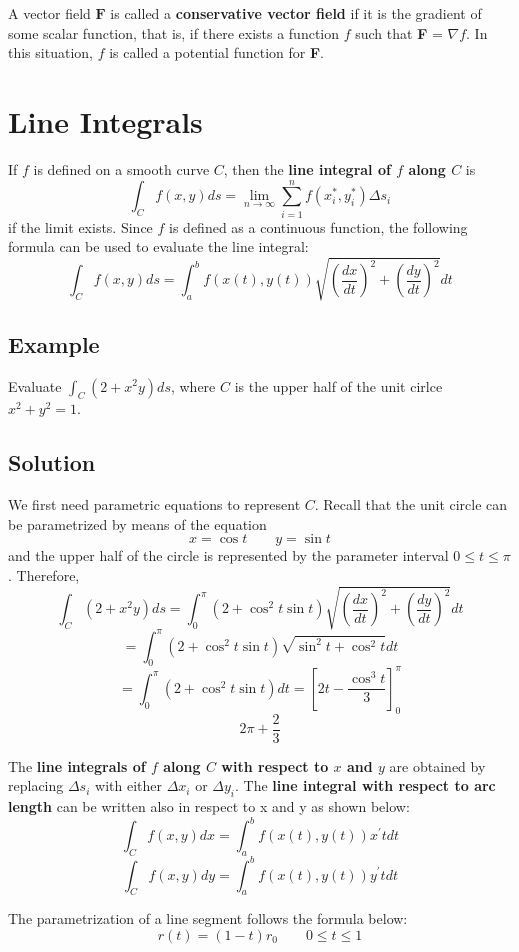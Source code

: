 A vector field $\textbf{F}$ is called a \textbf{conservative vector field} if it is the gradient of some scalar function, that is, if there exists a function $f$ such that \textbf{F} = 
$\nabla f$. In this situation, $f$ is called a potential function for \textbf{F}.

\section{Line Integrals}
If $f$ is defined on a smooth curve $C$, then the \textbf{line integral of $f$ along $C$} is $$\int_Cf(x,y)ds = \lim_{n\rightarrow\infty}\sum^n_{i=1}f(x^*_i, y^*_i)\Delta s_i$$if the limit exists.
Since $f$ is defined as a continuous function, the following formula can be used to evaluate the line integral:
$$\int_Cf(x,y)ds = \int^b_af(x(t), y(t))\sqrt{(\frac{dx}{dt})^2 + (\frac{dy}{dt})^2} dt$$

\subsection*{Example}
Evaluate $\int_C (2+x^2y) ds$, where $C$ is the upper half of the unit cirlce $x^2 + y^2 = 1$.
\subsection*{Solution}
We first need parametric equations to represent $C$. Recall that the unit circle can be parametrized by means of the equation 
$$x = \cos{t}\qquad y = \sin{t}$$ and the upper half of the circle is represented by the parameter interval $0\leq t\leq\pi$. Therefore, 
$$\int_C (2+x^2y) ds = \int^\pi_0(2+\cos^2{t}\sin{t})\sqrt{(\frac{dx}{dt})^2 + (\frac{dy}{dt})^2} dt$$
$$= \int^\pi_0(2+\cos^2{t}\sin{t})\sqrt{\sin^2{t} + \cos^2{t}} dt$$
$$= \int^\pi_0(2+\cos^2{t}\sin{t}) dt = \left[2t - \frac{\cos^3{t}}{3}\right]^\pi_0$$ $$2\pi + \frac{2}{3}$$

The \textbf{line integrals of $f$ along $C$ with respect to $x$ and $y$} are obtained by replacing $\Delta s_i$ with either $\Delta x_i$ or $\Delta y_i$.
The \textbf{line integral with respect to arc length} can be written also in respect to x and y as shown below:
$$\int_Cf(x,y)dx = \int^b_a f(x(t), y(t))x^\prime t dt$$
$$\int_Cf(x,y)dy = \int^b_a f(x(t), y(t))y^\prime t dt$$

The parametrization of a line segment follows the formula below: $$r(t) = (1-t)r_0\qquad 0\leq t\leq 1$$

